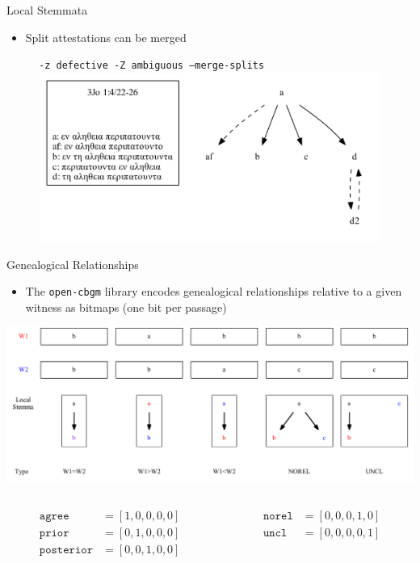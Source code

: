 \documentclass[10pt]{beamer}
\begin{document}
	\begin{frame}{Local Stemmata}
		\begin{itemize}
			\item Split attestations can be merged
		\end{itemize}
		\begin{figure}
			\centering
			\texttt{-z defective -Z ambiguous --merge-splits}
			\includegraphics[width=\textwidth]{../graphics/B25K1V4U22-26-local-stemma-ignore-defective-drop-ambiguous-merge-splits.pdf}
		\end{figure}
	\end{frame}
	\begin{frame}{Genealogical Relationships}
		\begin{itemize}
			\item The \texttt{open-cbgm} library encodes genealogical relationships relative to a given witness as bitmaps (one bit per passage)
		\end{itemize}
		\includegraphics[width=\textwidth]{../graphics/genealogical-relationships.pdf}
		\begin{columns}
			\begin{column}{0.5\textwidth}
				\begin{align*}
					\mathtt{agree} &= [1,0,0,0,0]\\
					\mathtt{prior} &= [0,1,0,0,0]\\
					\mathtt{posterior} &= [0,0,1,0,0]
				\end{align*}
			\end{column}
			\begin{column}{0.5\textwidth}
				\begin{align*}
					\mathtt{norel} &= [0,0,0,1,0]\\
					\mathtt{uncl} &= [0,0,0,0,1]
				\end{align*}
			\end{column}
		\end{columns}
	\end{frame}
\end{document}
